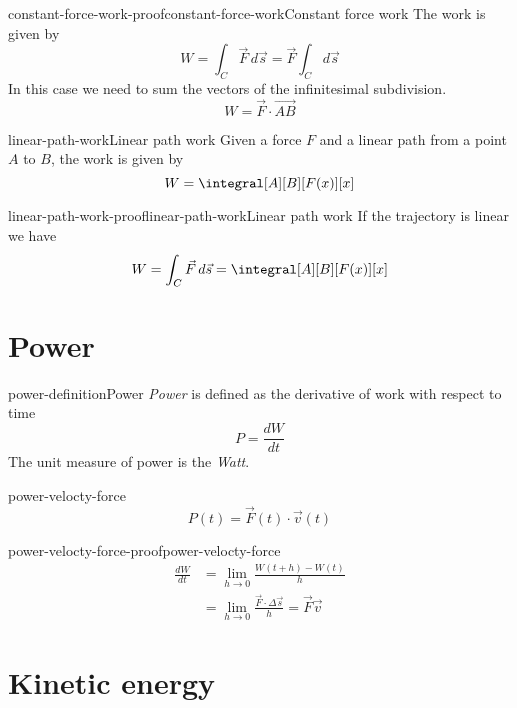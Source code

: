 \documentclass[preview]{standalone}
\begin{document}
\begin{snippetproof}{constant-force-work-proof}{constant-force-work}{Constant force work}
    The work is given by
    \[
        W = \int_C \vec{F}\,d\vec{s} = \vec{F} \int_C d\vec{s}
    \]
    In this case we need to sum the vectors of the infinitesimal subdivision.
    \[
        W = \vec{F} \cdot \vec{AB}
    \]
\end{snippetproof}

\begin{snippetproposition}{linear-path-work}{Linear path work}
    Given a force \(F\) and a linear path from a point \(A\) to \(B\), the work is given by
    \[
        W = \integral[A][B][F(x)][x]
    \]
\end{snippetproposition}

\begin{snippetproof}{linear-path-work-proof}{linear-path-work}{Linear path work}
    If the trajectory is linear we have
    \[
        W = \int_C \vec{F}\,d\vec{s} = \integral[A][B][F(x)][x]
    \]
\end{snippetproof}

\section{Power}

\begin{snippetdefinition}{power-definition}{Power}
    \emph{Power} is defined as the derivative of work with respect to time
    \[
        P = \frac{dW}{dt}
    \]
    The unit measure of power is the \emph{Watt}.
\end{snippetdefinition}

\begin{snippetproposition}{power-velocty-force}{}
    \[
        P(t) = \vec{F}(t) \cdot \vec{v}(t)
    \]
\end{snippetproposition}

\begin{snippetproof}{power-velocty-force-proof}{power-velocty-force}{}
    \begin{align*}
        \frac{dW}{dt} &= \lim_{h\to 0} \frac{W(t + h) - W(t)}{h} \\
        &= \lim_{h\to 0} \frac{\vec{F} \cdot \Delta \vec{s}}{h} = \vec{F} \vec{v}
    \end{align*}
\end{snippetproof}

\section{Kinetic energy}
\end{document}

